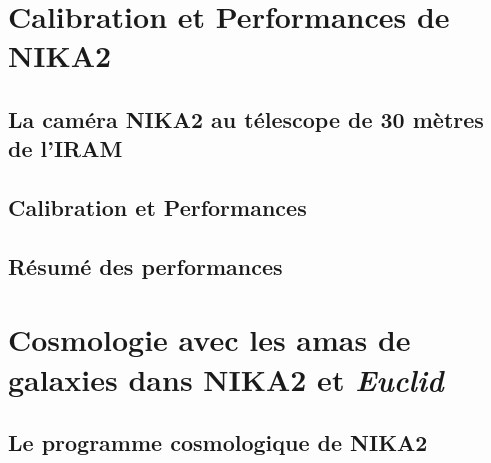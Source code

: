 \documentclass[a4paper, 12pt]{report}
\begin{document}
\part{Calibration et Performances de NIKA2}
%
%   
%
\chapter{La caméra NIKA2 au télescope de 30 mètres de l'IRAM}

%
%   
%
\chapter{Calibration et Performances}


%
%   
%
\chapter{Résumé des performances}


%
%
%
%
%
%
%

\part{Cosmologie avec les amas de galaxies dans NIKA2 et \emph{Euclid}}
%
%
\chapter{Le programme cosmologique de NIKA2}

{\color{vert}\lipsum[4]}

\end{document}
